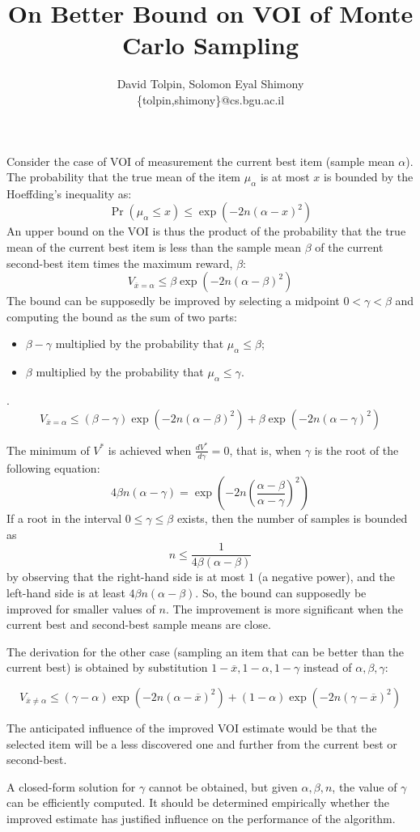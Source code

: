 \documentclass{article}
\title{On Better Bound on VOI of Monte Carlo Sampling}
\author {David Tolpin, Solomon Eyal Shimony \\
\{tolpin,shimony\}@cs.bgu.ac.il}
\begin{document}
\maketitle

Consider the case of VOI of measurement the current best item (sample mean
$\alpha$). The probability that the true mean of the item $\mu_\alpha$ is at
most $x$ is bounded by the Hoeffding's inequality as:
\[ \Pr(\mu_\alpha \le x) \le \exp\left(-2n(\alpha-x)^2\right) \]
An upper bound on the VOI is thus the product of the probability that
the true mean of the current best item is less than the sample mean
$\beta$ of the current second-best item times the maximum reward,
$\beta$:
\[ V_{\overline x=\alpha} \le \beta \exp\left(-2n(\alpha-\beta)^2\right) \]
The bound can be supposedly be improved by selecting a midpoint
$0 < \gamma < \beta$ and computing the bound as the sum of two parts:
\begin{itemize}
\item $\beta-\gamma$ multiplied by the probability that
  $\mu_\alpha \le \beta$;
\item $\beta$ multiplied by the probability that $\mu_\alpha\le
  \gamma$.
\end{itemize}.
\[ V_{\overline x=\alpha} \le (\beta-\gamma)\exp\left(-2n(\alpha-\beta)^2\right)+\beta\exp\left(-2n(\alpha-\gamma)^2\right) \]

\vspace{\baselineskip}

The minimum of $V^*$ is achieved when $\frac {dV^*} {d\gamma}=0$, that
is, when $\gamma$ is the root of the following equation:
\[ 4\beta n(\alpha-\gamma)=\exp\left(-2n\left(\frac {\alpha-\beta}
    {\alpha-\gamma}\right)^2\right) \]
If a root in the interval  $0\le\gamma\le\beta$ exists, then the
number of samples is bounded as
\[n\le\frac 1 {4\beta(\alpha-\beta)}\]
by observing that the right-hand side 
is at most $1$ (a negative power), and the left-hand side is at least
$4\beta n(\alpha-\beta)$.
So, the bound can supposedly be improved for smaller values of
$n$. The improvement is more significant when the current best and
second-best sample means are close.

The derivation for the other case
(sampling an item that can be better than the current best) is
obtained by substitution $1-\overline x, 1-\alpha, 1-\gamma$ instead of
$\alpha, \beta, \gamma$:

\[ V_{\overline x\ne\alpha} \le (\gamma-\alpha)\exp\left(-2n(\alpha-\overline
  x)^2\right)+(1-\alpha)\exp\left(-2n(\gamma-\overline x)^2\right) \]

The anticipated influence of the improved
VOI estimate would be that the selected item will be a less discovered
one and further from the current best or second-best.

A closed-form solution for $\gamma$ cannot be obtained, but given
$\alpha, \beta, n$, the value of $\gamma$ can be efficiently
computed. It should be determined empirically whether the improved
estimate has justified influence on the performance of the algorithm.
\end{document}
